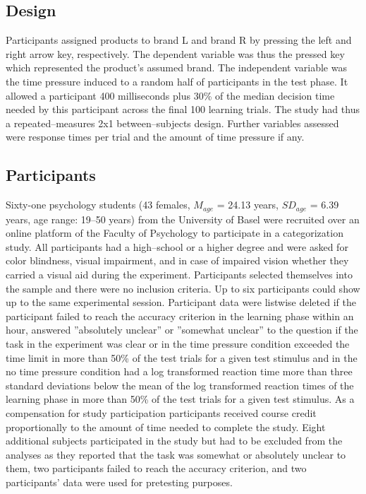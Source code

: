 \documentclass[a4paper,man,natbib]{apa6}
\begin{document}
\subsection{Design}
Participants assigned products to brand L and brand R by pressing the left and right arrow key, respectively. The dependent variable was thus the pressed key which represented the product's assumed brand. The independent variable was the time pressure induced to a random half of participants in the test phase. It allowed a participant 400 milliseconds plus 30\% of the median decision time needed by this participant across the final 100 learning trials. The study had thus a repeated--measures 2x1 between--subjects design. Further variables assessed were response times per trial and the amount of time pressure if any.

\subsection{Participants}
Sixty-one psychology students (43 females, $M_{age}$ = 24.13 years, $SD_{age}$ = 6.39 years, age range: 19--50 years) from the University of Basel were recruited over an online platform of the Faculty of Psychology to participate in a categorization study. All participants had a high--school or a higher degree and were asked for color blindness, visual impairment, and in case of impaired vision whether they carried a visual aid during the experiment. Participants selected themselves into the sample and there were no inclusion criteria. Up to six participants could show up to the same experimental session. Participant data were listwise deleted if the participant failed to reach the accuracy criterion in the learning phase within an hour, answered ''absolutely unclear'' or ''somewhat unclear'' to the question if the task in the experiment was clear or in the time pressure condition exceeded the time limit in more than 50\% of the test trials for a given test stimulus and in the no time pressure condition had a log transformed reaction time more than three standard deviations below the mean of the log transformed reaction times of the learning phase in more than 50\% of the test trials for a given test stimulus.  As a compensation for study participation participants received course credit proportionally to the amount of time needed to complete the study. Eight additional subjects participated in the study but had to be excluded from the analyses as they reported that the task was somewhat or absolutely unclear to them, two participants failed to reach the accuracy criterion, and two participants' data were used for pretesting purposes.
\end{document}
